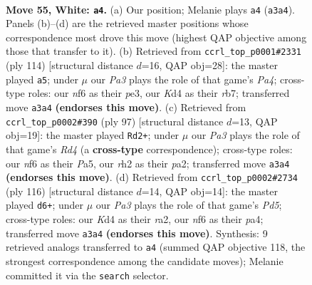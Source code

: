 \documentclass[11pt]{article}
\begin{document}
\clearpage

\begin{figure}[p]\centering
\begin{subfigure}{0.46\textwidth}\centering
\resizebox{\linewidth}{!}{%
\newchessgame
\chessboard[
  setfen={8/R7/5nk1/1P6/2pK2P1/P7/7r/8 w - - 2 55},
  showmover=false,
  pgfstyle=straightmove, color=movearrow, markmove={a3-a4}
]}
\caption{}
\end{subfigure}\hfill
\begin{subfigure}{0.46\textwidth}\centering
\resizebox{\linewidth}{!}{%
\newchessgame
\chessboard[
  setfen={8/1r6/1P6/8/P4R2/4p2p/4k2K/8 w - - 2 58},
  showmover=false,
  pgfstyle=straightmove, color=movearrow, markmove={a4-a5}
]}
\caption{}
\end{subfigure}
\\[4pt]
\begin{subfigure}{0.46\textwidth}\centering
\resizebox{\linewidth}{!}{%
\newchessgame
\chessboard[
  setfen={8/8/1R6/p2r4/5k1p/5P2/P6K/8 b - - 0 49},
  showmover=false,
  pgfstyle=straightmove, color=movearrow, markmove={d5-d2}
]}
\caption{}
\end{subfigure}\hfill
\begin{subfigure}{0.46\textwidth}\centering
\resizebox{\linewidth}{!}{%
\newchessgame
\chessboard[
  setfen={8/8/7p/1R1P1k2/p7/P4P2/r7/6K1 w - - 0 59},
  showmover=false,
  pgfstyle=straightmove, color=movearrow, markmove={d5-d6}
]}
\caption{}
\end{subfigure}
\caption{\textbf{Move 55, White: \texttt{a4}.} (a) Our position; Melanie plays \texttt{a4} (\texttt{a3a4}). Panels (b)--(d) are the retrieved master positions whose correspondence most drove this move (highest QAP objective among those that transfer to it). (b) Retrieved from \texttt{ccrl\_top\_p0001\#2331} (ply 114) [structural distance $d$=16, QAP obj=28]: the master played \texttt{a5}; under $\mu$ our \emph{Pa3} plays the role of that game's \emph{Pa4}; cross-type roles: our \emph{n}f6 as their \emph{p}e3, our \emph{K}d4 as their \emph{r}b7; transferred move \texttt{a3a4} \textbf{(endorses this move)}. (c) Retrieved from \texttt{ccrl\_top\_p0002\#390} (ply 97) [structural distance $d$=13, QAP obj=19]: the master played \texttt{Rd2+}; under $\mu$ our \emph{Pa3} plays the role of that game's \emph{Rd4} (a \textbf{cross-type} correspondence); cross-type roles: our \emph{n}f6 as their \emph{P}a5, our \emph{r}h2 as their \emph{p}a2; transferred move \texttt{a3a4} \textbf{(endorses this move)}. (d) Retrieved from \texttt{ccrl\_top\_p0002\#2734} (ply 116) [structural distance $d$=14, QAP obj=14]: the master played \texttt{d6+}; under $\mu$ our \emph{Pa3} plays the role of that game's \emph{Pd5}; cross-type roles: our \emph{K}d4 as their \emph{r}a2, our \emph{n}f6 as their \emph{p}a4; transferred move \texttt{a3a4} \textbf{(endorses this move)}. Synthesis: 9 retrieved analogs transferred to \texttt{a4} (summed QAP objective 118, the strongest correspondence among the candidate moves); Melanie committed it via the \texttt{search} selector.}
\label{fig:thought-m108}
\end{figure}
\end{document}
